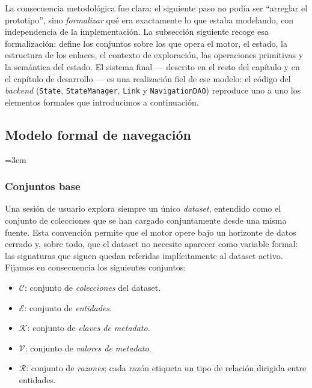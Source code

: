 La consecuencia metodológica fue clara: el siguiente paso no podía ser ``arreglar el prototipo'', sino
\emph{formalizar} qué era exactamente lo que estaba modelando, con independencia de la implementación. La
subsección siguiente recoge esa formalización: define los conjuntos sobre los que opera el motor, el estado, la
estructura de los enlaces, el contexto de exploración, las operaciones primitivas y la semántica del estado.
El sistema final --- descrito en el resto del capítulo y en el capítulo de desarrollo --- es una realización
fiel de ese modelo: el código del \textit{backend} (\texttt{State}, \texttt{StateManager}, \texttt{Link} y
\texttt{NavigationDAO}) reproduce uno a uno los elementos formales que introducimos a continuación.

\subsection{Modelo formal de navegación}
\label{subsec:modeloFormal}

\emergencystretch=3em

\subsubsection*{Conjuntos base}

Una sesión de usuario explora siempre un único \emph{dataset}, entendido como el conjunto de colecciones que
se han cargado conjuntamente desde una misma fuente. Esta convención permite que el motor opere bajo un
horizonte de datos cerrado y, sobre todo, que el dataset no necesite aparecer como variable formal: las
signaturas que siguen quedan referidas implícitamente al dataset activo. Fijamos en consecuencia los
siguientes conjuntos:

\begin{itemize}
  \item $\mathcal{C}$: conjunto de \emph{colecciones} del dataset.
  \item $\mathcal{E}$: conjunto de \emph{entidades}.
  \item $\mathcal{K}$: conjunto de \emph{claves de metadato}.
  \item $\mathcal{V}$: conjunto de \emph{valores de metadato}.
  \item $\mathcal{R}$: conjunto de \emph{razones}; cada razón etiqueta un tipo de relación dirigida entre entidades.
\end{itemize}

